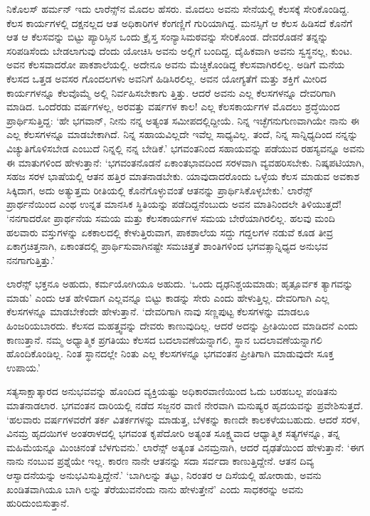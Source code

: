 ನಿಕೊಲಸ್ ಹರ್ಮನ್ ಇದು ಲಾರೆನ್ಸ್​ನ ಮೊದಲ ಹೆಸರು. ಮೊದಲು ಅವನು ಸೇನೆಯಲ್ಲಿ ಕೆಲಸಕ್ಕೆ ಸೇರಿಕೊಂಡಿದ್ದ. ಕೆಲಸ ಕಾರ್ಯಗಳಲ್ಲಿ ದಕ್ಷನಲ್ಲದ ಆತ ಅಧಿಕಾರಿಗಳ ಕೆಂಗಣ್ಣಿಗೆ ಗುರಿಯಾಗಿದ್ದ. ಮನಸ್ಸಿಗೆ ಆ ಕೆಲಸ ಹಿಡಿಸದೆ ಕೊನೆಗೆ ಆತ ಆ ಕೆಲಸವನ್ನು ಬಿಟ್ಟು ಪ್ಯಾರಿಸ್ಸಿನ ಒಂದು ಕ್ರೈಸ್ತ ಸಂನ್ಯಾಸಿಮಠವನ್ನು ಸೇರಿಕೊಂಡ. ದೇವರೊಡನೆ ತನ್ನನ್ನು ಸರಿಪಡಿಸೆಂದು ಬೇಡಲಾಗುವು ದೆಂದು ಯೋಚಿಸಿ ಅವನು ಅಲ್ಲಿಗೆ ಬಂದಿದ್ದ. ದೈಹಿಕವಾಗಿ ಅವನು ಸ್ವಸ್ಥನಲ್ಲ, ಕುಂಟ. ಅವನ ಕೆಲಸವಾದರೋ ಪಾಕಶಾಲೆಯಲ್ಲಿ. ಅದೇನೂ ಅವನು ಮೆಚ್ಚಿಕೊಂಡಿದ್ದ ಕೆಲಸವಾಗಿರಲಿಲ್ಲ. ಅಡಿಗೆ ಮನೆಯ ಕೆಲಸದ ಒತ್ತಡ ಅವಸರ ಗೊಂದಲಗಳು ಅವನಿಗೆ ಹಿಡಿಸಿರಲಿಲ್ಲ. ಅವನ ಯೋಗ್ಯತೆಗೆ ಮತ್ತು ಶಕ್ತಿಗೆ ಮೀರಿದ ಕಾರ್ಯಗಳನ್ನೂ ಕೆಲವೊಮ್ಮೆ ಅಲ್ಲಿ ನಿರ್ವಹಿಸಬೇಕಾಗು ತ್ತಿತ್ತು. ಆದರೆ ಅವನು ಎಲ್ಲ ಕೆಲಸಗಳನ್ನೂ ದೇವರಿಗಾಗಿ ಮಾಡಿದ. ಒಂದೆರಡು ವರ್ಷಗಳಲ್ಲ, ಅರವತ್ತು ವರ್ಷಗಳ ಕಾಲ! ಎಲ್ಲ ಕೆಲಸಕಾರ್ಯಗಳ ಮೊದಲು ಶ್ರದ್ಧೆಯಿಂದ ಪ್ರಾರ್ಥಿಸುತ್ತಿದ್ದ: ‘ಹೇ ಭಗವಾನ್, ನೀನು ನನ್ನ ಅತ್ಯಂತ ಸಮೀಪದಲ್ಲಿದ್ದೀಯೆ. ನಿನ್ನ ಇಚ್ಛೆಗನುಗುಣವಾಗಿಯೇ ನಾನು ಈ ಎಲ್ಲ ಕೆಲಸಗಳನ್ನೂ ಮಾಡಬೇಕಾಗಿದೆ. ನಿನ್ನ ಸಹಾಯವಿಲ್ಲದೇ ಇವೆಲ್ಲ ಸಾಧ್ಯವಿಲ್ಲ. ತಂದೆ, ನಿನ್ನ ಸಾನ್ನಿಧ್ಯದಿಂದ ನನ್ನನ್ನು ವಿಚ್ಯುತಿಗೊಳಿಸಬೇಡ ಎಂಬುದೆ ನಿನ್ನಲ್ಲಿ ನನ್ನ ಬೇಡಿಕೆ.’ ಭಗವಂತನಿಂದ ಸಹಾಯವನ್ನು ಪಡೆಯುವ ರಹಸ್ಯವನ್ನೂ ಅವನು ಈ ಮಾತುಗಳಿಂದ ಹೇಳುತ್ತಾನೆ: ‘ಭಗವಂತನೊಡನೆ ಏಕಾಂತಭಾವದಿಂದ ಸರಳವಾಗಿ ವ್ಯವಹರಿಸಬೇಕು. ನಿಷ್ಕಪಟಿಯಾಗಿ, ಸಹಜ ಸರಳ ಭಾಷೆಯಲ್ಲಿ ಆತನ ಹತ್ತಿರ ಮಾತನಾಡಬೇಕು. ಯಾವುದಾದರೊಂದು ಒಳ್ಳೆಯ ಕೆಲಸ ಮಾಡುವ ಅವಕಾಶ ಸಿಕ್ಕಿದಾಗ, ಅದು ಅತ್ಯುತ್ತಮ ರೀತಿಯಲ್ಲಿ ಕೊನೆಗೊಳ್ಳುವಂತೆ ಆತನನ್ನು ಪ್ರಾರ್ಥಿಸಿಕೊಳ್ಳಬೇಕು.’ ಲಾರೆನ್ಸ್ ಪ್ರಾರ್ಥನೆಯಿಂದ ಎಂಥ ಉನ್ನತ ಮಾನಸಿಕ ಸ್ಥಿತಿಯನ್ನು ಪಡೆದಿದ್ದನೆಂಬುದು ಅವನ ಮಾತಿನಿಂದಲೇ ತಿಳಿಯುತ್ತದೆ! ‘ನನಗಾದರೋ ಪ್ರಾರ್ಥನೆಯ ಸಮಯ ಮತ್ತು ಕೆಲಸಕಾರ್ಯಗಳ ಸಮಯ ಬೇರೆಯಾಗಿರಲಿಲ್ಲ. ಹಲವು ಮಂದಿ ಹಲವಾರು ವಸ್ತುಗಳನ್ನು ಏಕಕಾಲದಲ್ಲಿ ಕೇಳುತ್ತಿರುವಾಗ, ಪಾಕಶಾಲೆಯ ಸದ್ದು ಗದ್ದಲಗಳ ನಡುವೆ ಕೂಡ ತೀವ್ರ ಏಕಾಗ್ರಚಿತ್ತನಾಗಿ, ಏಕಾಂತದಲ್ಲಿ ಪ್ರಾರ್ಥಿಸುವಾಗಿನಷ್ಟೇ ಸಮಚಿತ್ತತೆ ಶಾಂತಿಗಳಿಂದ ಭಗವತ್ಸಾನ್ನಿಧ್ಯದ ಅನುಭವ ನನಗಾಗುತ್ತಿತ್ತು.’

ಲಾರೆನ್ಸ್ ಭಕ್ತನೂ ಅಹುದು, ಕರ್ಮಯೋಗಿಯೂ ಅಹುದು. ‘ಒಂದು ದೃಢನಿಶ್ಚಯಮಾಡು; ಹೃತ್ಪೂರ್ವಕ ತ್ಯಾಗವನ್ನು ಮಾಡು’ ಎಂದು ಆತ ಹೇಳಿದಾಗ ಎಲ್ಲವನ್ನೂ ಬಿಟ್ಟು ಕಾಡನ್ನು ಸೇರು ಎಂದು ಹೇಳುತ್ತಿಲ್ಲ. ದೇವರಿಗಾಗಿ ಎಲ್ಲ ಕೆಲಸಗಳನ್ನೂ ಮಾಡಬೇಕೆಂದೇ ಹೇಳುತ್ತಾನೆ. ‘ದೇವರಿಗಾಗಿ ನಾವು ಸಣ್ಣಪುಟ್ಟ ಕೆಲಸಗಳನ್ನು ಮಾಡಲೂ ಹಿಂಜರಿಯಬಾರದು. ಕೆಲಸದ ಮಹತ್ತ್ವವನ್ನು ದೇವರು ಕಾಣುವುದಿಲ್ಲ. ಆದರೆ ಅದನ್ನು ಪ್ರೀತಿಯಿಂದ ಮಾಡಿದನೆ ಎಂದು ಕಾಣುತ್ತಾನೆ. ನಮ್ಮ ಅಧ್ಯಾತ್ಮಿಕ ಪ್ರಗತಿಯು ಕೆಲಸದ ಬದಲಾವಣೆಯನ್ನಾಗಲಿ, ಸ್ಥಾನ ಬದಲಾವಣೆಯನ್ನಾಗಲಿ ಹೊಂದಿಕೊಂಡಿಲ್ಲ. ನಿಂತ ಸ್ಥಾನದಲ್ಲೇ ನಿಂತು ಎಲ್ಲ ಕೆಲಸಗಳನ್ನೂ ಭಗವಂತನ ಪ್ರೀತಿಗಾಗಿ ಮಾಡುವುದೇ ಸೂಕ್ತ ಉಪಾಯ.’

ಸತ್ಯಸಾಕ್ಷಾತ್ಕಾರದ ಅನುಭವವನ್ನು ಹೊಂದಿದ ವ್ಯಕ್ತಿಯಷ್ಟು ಅಧಿಕಾರವಾಣಿಯಿಂದ ಓದು ಬರಹಬಲ್ಲ ಪಂಡಿತನು ಮಾತನಾಡಲಾರ. ಭಗವಂತನ ದಾರಿಯಲ್ಲಿ ನಡೆದ ಸಜ್ಜನರ ವಾಣಿ ನೇರವಾಗಿ ಮನುಷ್ಯರ ಹೃದಯವನ್ನು ಪ್ರವೇಶಿಸುತ್ತದೆ. ‘ಹಲವಾರು ವರ್ಷಗಳವರೆಗೆ ತರ್ಕ ವಿತರ್ಕಗಳನ್ನು ಮಾಡುತ್ತ, ಬೆಳಕನ್ನು ಕಾಣದೇ ಕಾಲಕಳೆಯಬಹುದು. ಆದರೆ ಸರಳ, ವಿನಮ್ರ ಹೃದಯಿಗಳ ಅಂತರಾಳದಲ್ಲಿ ಭಗವಂತ ಕೃಪೆದೋರಿ ಅತ್ಯಂತ ಸೂಕ್ಷ್ಮವಾದ ಆಧ್ಯಾತ್ಮಿಕ ಸತ್ಯಗಳನ್ನೂ, ತನ್ನ ಮಹಿಮೆಯನ್ನೂ ಮಿಂಚಿನಂತೆ ಬೆಳಗುವನು.’ ಲಾರೆನ್ಸ್ ಅತ್ಯಂತ ವಿನಮ್ರನಾಗಿ, ಆದರೆ ದೃಢತೆಯಿಂದ ಹೇಳುತ್ತಾನೆ: ‘ಈಗ ನಾನು ನಂಬುವ ಪ್ರಶ್ನೆಯೇ ಇಲ್ಲ. ಕಾರಣ ನಾನೇ ಆತನನ್ನು ಸದಾ ಸರ್ವದಾ ಕಾಣುತ್ತಿದ್ದೇನೆ. ಆತನ ದಿವ್ಯ ಆಸ್ವಾದನೆಯನ್ನು ಅನುಭವಿಸುತ್ತಿದ್ದೇನೆ.’ ‘ಬಾಗಿಲನ್ನು ತಟ್ಟು, ನಿರಂತರ ಆ ದಿಸೆಯಲ್ಲಿ ಹೋರಾಡು, ಅವನು ಖಂಡಿತವಾಗಿಯೂ ಬಾಗಿ ಲನ್ನು ತೆರೆಯುವನೆಂದು ನಾನು ಹೇಳುತ್ತೇನೆ’ ಎಂದು ಸಾಧಕರನ್ನು ಅವನು ಹುರಿದುಂಬಿಸುತ್ತಾನೆ.

